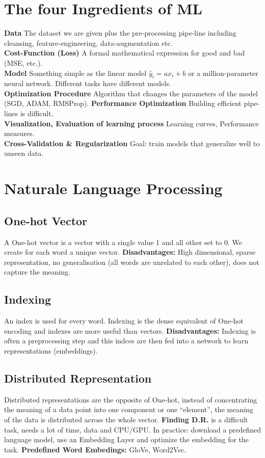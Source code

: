 \section{The four Ingredients of ML}
\textbf{Data} The dataset we are given plus the pre-processing pipe-line including cleansing, feature-engineering, data-augmentation etc. \\
\textbf{Cost-Function (Loss)}
  	A formal mathematical expression for good and bad (MSE, etc.). \\
\textbf{Model} Something simple as the linear model $\hat{y}_{i}=ax_{i}+b$ or a million-parameter neural network. Different tasks have different models. \\
\textbf{Optimization Procedure} Algorithm that changes the parameters of the model (SGD, ADAM, RMSProp).
\textbf{Performance Optimization} Building efficient pipe-lines is difficult. \\
\textbf{Visualization, Evaluation of learning process} Learning curves, Performance measures. \\
\textbf{Cross-Validation \& Regularization} Goal: train models that generalize well to unseen data.

\section{Naturale Language Processing}
\subsection{One-hot Vector}
A One-hot vector is a vector with a single value 1 and all other set to 0. We create for each word a unique vector. \textbf{Disadvantages:} High dimensional, sparse representation, no generalisation (all words are unrelated to each other), does not capture the meaning.

\subsection{Indexing}
An index is used for every word. Indexing is the dense equivalent of One-hot encoding and indexes are more useful than vectors. \textbf{Disadvantages:} Indexing is often a preprocessing step and this indces are then fed into a network to learn representations (embeddings).

\subsection{Distributed Representation}
Distributed representations are the opposite of One-hot, instead of concentrating the meaning of a data point into one component or one “element”, the meaning of the data is distributed across the whole vector. \textbf{Finding D.R.} is a difficult task, needs a lot of time, data and CPU/GPU. In practice: download a predefined language model, use an Embedding Layer and optimize the embedding for the task. \textbf{Predefined Word Embedings:} GloVe, Word2Vec.

